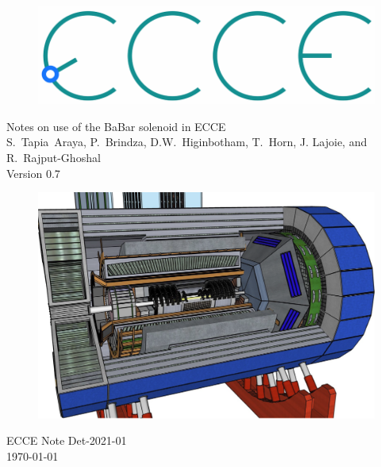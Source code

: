 \renewcommand*\familydefault{\sfdefault}
{\sffamily
\vfill
\vspace{4cm}
\begin{figure}[H]
  \begin{center}
  \includegraphics[width=0.3\linewidth]{figs/ecce-logo.png}
\end{center}
\end{figure}

\vspace{2mm}

\begin{center}
  \large
{\LARGE{Notes on use of the BaBar solenoid in ECCE}} \\
\vspace{0.25cm}
S.~Tapia~Araya, P.~Brindza, D.W.~Higinbotham, T.~Horn, J. Lajoie, and R.~Rajput-Ghoshal
\\
Version 0.7
\\
\end{center}


\vfill
\begin{figure}[H]
  \begin{center}
    \includegraphics[width=0.7\linewidth]{figs/ECCE.png}
  \end{center}
\end{figure}
}
\vspace{2.5cm}

\begin{center}
{\LARGE{ECCE Note Det-2021-01}} \\
\vspace{2mm}
{\large{\today}}
\end{center}
\renewcommand*\familydefault{\rmdefault}
